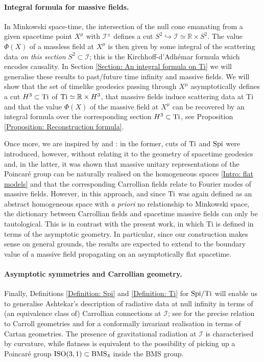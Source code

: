 \documentclass[a4paper, 10pt]{article}
\theoremstyle{remark}
\newcommand{\Ti}{\textnormal{Ti}}
\newcommand{\Spi}{\textnormal{Spi}}
\newcommand{\Scri}{\mathscr{I}}
\newcommand{\BMS}{\textnormal{BMS}}
\begin{document}
\paragraph{Integral formula for massive fields.}\mbox{}
 In Minkowski space-time, the intersection of the null cone emanating from a given spacetime point $X^{\mu}$ with $\Scri^{\pm}$ defines a cut $S^2 \hookrightarrow \Scri \simeq \mathbb{R} \times S^2$. The value $\Phi(X)$ of a massless field at $X^{\mu}$ is then given by some integral of the scattering data \emph{on this section} $S^2 \subset \Scri$; this is the Kirchhoff-d'Adhémar formula \cite{Kirchhoff:1883aa,Penrose_1980,penrose_spinors_1984} which encodes causality. In Section \ref{Section: An integral formula on Ti} we will generalise these results to past/future time infinity and massive fields. We will show that the set of timelike geodesics passing through $X^\mu$ asymptotically defines a cut $H^3 \subset \Ti$ of $\Ti \simeq \mathbb{R} \times H^3$, that massive fields induce scattering data at Ti and that the value $\Phi(X)$ of the massive field at $X^{\mu}$ can be recovered by an integral formula over the corresponding section $H^3 \subset \Ti$, see Proposition \ref{Proposition: Reconstruction formula}. 

Once more, we are inspired by \cite{Figueroa-OFarrill:2021sxz} and \cite{Have:2024dff}: in the former, cuts of $\Ti$ and $\Spi$ were introduced, however, without relating it to the geometry of spacetime geodesics and, in the latter, it was shown that massive unitary representations of the Poincaré group can be naturally realised on the homogeneous spaces \eqref{Intro: flat models} and that the corresponding Carrollian fields relate to Fourier modes of massive fields. However, in this approach, and since $\Ti$ was again defined as an abstract homogeneous space with \emph{a priori} no relationship to Minkowski space, the dictionary between Carrollian fields and spacetime massive fields can only be tautological. This is in contrast with the present work, in which Ti is defined in terms of the asymptotic geometry. In particular, since our construction makes sense on general grounds, the results are expected to extend to the boundary value of a massive field propagating on an asymptotically flat spacetime.\\

\paragraph{Asymptotic symmetries and Carrollian geometry.}\mbox{}
Finally, Definitions \ref{Definition: Spi} and \ref{Definition: Ti} for $\Spi/\Ti$ will enable us to generalise Ashtekar's description of radiative data at null infinity \cite{geroch_asymptotic_1977, ashtekar_radiative_1981,ashtekar_geometry_2015} in terms of (an equivalence class of) Carrollian connections at $\Scri$; see \cite{Herfray:2021qmp} for the precise relation to Carroll geometries and \cite{herfray_asymptotic_2020,herfray_tractor_2022} for a conformally invariant realisation in terms of Cartan geometries. The presence of gravitational radiation at  $\Scri$ is characterised by curvature, while flatness is equivalent to the possibility of picking up a Poincaré group $\textrm{ISO}(3,1) \subset \BMS_4$ inside the BMS group.
\end{document}
